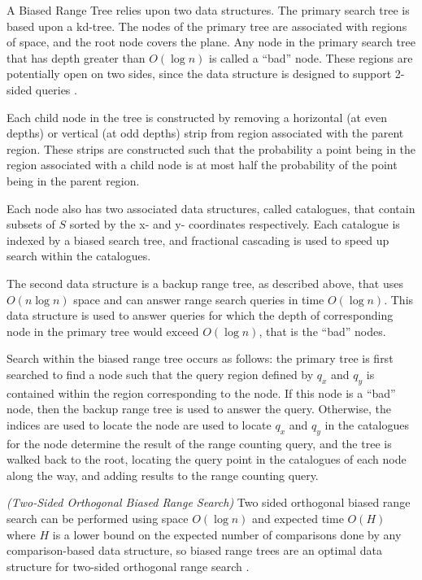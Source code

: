 \documentclass[mcs]{scsthesis}
\begin{document}
A Biased Range Tree relies upon two data structures. The primary search tree
is based upon a kd-tree. The nodes of the primary tree are associated with
regions of space, and the root node covers the plane. Any node in the primary
search tree that has depth greater than \(O(\log n)\) is called a ``bad'' node.
These regions are potentially open on two sides, since the data structure is
designed to support 2-sided queries \cite{biasedrange}. 

Each child node in the tree is constructed by removing a horizontal (at even
depths) or vertical (at odd depths) strip from region associated with the
parent region. These strips are constructed such that the probability a point
being in the region associated with a child node is at most half the probability
of the point being in the parent region.

Each node also has two associated data structures, called catalogues, that 
contain subsets of \(S\) sorted by the x- and y- coordinates respectively.
Each catalogue is indexed by a biased search tree, and fractional cascading is
used to speed up search within the catalogues.

The second data structure is a backup range tree, as described above, that 
uses \(O(n \log n)\) space and can answer range search queries in time
\(O(\log n)\). This data structure is used to answer queries for which the
depth of corresponding node in the primary tree would exceed \(O(\log n)\),
that is the ``bad'' nodes.

Search within the biased range tree occurs as follows: the primary tree is
first searched to find a node such that the query region defined by \(q_x\) and
\(q_y\) is contained within the region corresponding to the node. If this node
is a ``bad'' node, then the backup range tree is used to answer the query.
Otherwise, the indices are used to locate the node are used to locate \(q_x\)
and \(q_y\) in the catalogues for the node determine the result of the range
counting query, and the tree is walked back to the root, locating the query
point in the catalogues of each node along the way, and adding results to
the range counting query.

\begin{thm} \emph{(Two-Sided Orthogonal Biased Range Search)} 
Two sided orthogonal biased range search can be performed using space
\(O(\log n)\) and expected time \(O(H)\) where \(H\) is a lower bound on the
expected number of comparisons done by any comparison-based data structure, so
biased range trees are an optimal data structure for two-sided orthogonal
range search \cite{biasedrange}.
\end{thm}
\end{document}
